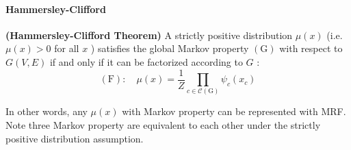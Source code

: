 \documentclass{article}
\newcommand{\bfs}[1]{\textbf{({#1}) }}
\begin{document}
\paragraph{Hammersley-Clifford}
\begin{thma}\bfs{Hammersley-Clifford Theorem}\label{thm:ham_cliff}
A strictly positive distribution $\mu(x)$ (i.e. $\mu(x)>0$ for all $x$ ) satisfies the global Markov property $(\mathrm{G})$ with respect to $G(V, E)$ if and only if it can be factorized according to $G$ :
$$(\mathrm{F}): \quad \mu(x)=\frac{1}{Z} \prod_{c \in \mathcal{C}(\mathrm{G})} \psi_{c}\left(x_{c}\right)$$
\end{thma}
\begin{rema}
In other words, any $\mu(x)$ with Markov property can be represented with MRF. Note three Markov property  are equivalent to each other under the strictly positive distribution  assumption.
\end{rema}
\end{document}
